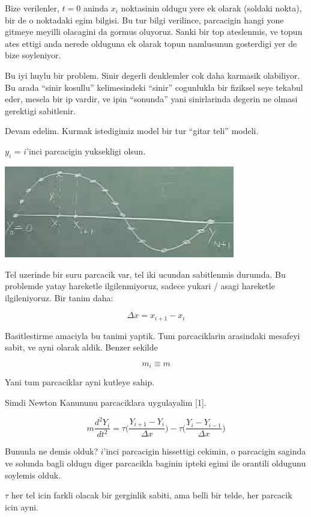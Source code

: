 \documentclass[12pt,fleqn]{article}\usepackage{../common}
\begin{document}
Bize verilenler, $t=0$ aninda $x_i$ noktasinin oldugu yere ek olarak
(soldaki nokta), bir de o noktadaki egim bilgisi. Bu tur bilgi verilince,
parcacigin hangi yone gitmeye meyilli olacagini da gormus oluyoruz. Sanki
bir top ateslenmis, ve topun ates ettigi anda nerede olduguna ek olarak
topun namlusunun gosterdigi yer de bize soyleniyor.

Bu iyi huylu bir problem. Sinir degerli denklemler cok daha karmasik
olabiliyor. Bu arada ``sinir kosullu'' kelimesindeki ``sinir'' cogunlukla
bir fiziksel seye tekabul eder, mesela bir ip vardir, ve ipin ``sonunda''
yani sinirlarinda degerin ne olmasi gerektigi sabitlenir. 

Devam edelim. Kurmak istedigimiz model bir tur ``gitar teli'' modeli. 

$y_i$ = $i$'inci parcacigin yuksekligi olsun. 

\includegraphics[height=4cm]{1_07.png}

Tel uzerinde bir suru parcacik var, tel iki ucundan sabitlenmis durumda. Bu
problemde yatay hareketle ilgilenmiyoruz, sadece yukari / asagi hareketle
ilgileniyoruz. Bir tanim daha:

\[ \Delta x = x_{i+1} - x_i  \]

Basitlestirme amaciyla bu tanimi yaptik. Tum parcaciklarin arasindaki
mesafeyi sabit, ve ayni olarak aldik. Benzer sekilde

\[ m_i \equiv m \]

Yani tum parcaciklar ayni kutleye sahip. 

Simdi Newton Kanununu parcaciklara uygulayalim [1]. 

\[ m \frac{d^2Y_i}{dt^2} = 
\tau \bigg( \frac{Y_{i+1}- Y_i}{\Delta x} \bigg) -
\tau \bigg( \frac{Y_{i}- Y_{i-1}}{\Delta x} \bigg) 
\]

Bununla ne demis olduk? $i$'inci parcacigin hissettigi cekimin, o
parcacigin saginda ve solunda bagli oldugu diger parcacikla baginin ipteki
egimi ile orantili oldugunu soylemis olduk.

$\tau$ her tel icin farkli olacak bir gerginlik sabiti, ama belli bir
telde, her parcacik icin ayni. 
\end{document}
